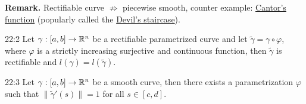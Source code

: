 \documentclass[../Analysis-3.tex]{subfiles}
\begin{document}
\textbf{Remark.} Rectifiable curve $\not\Rightarrow$ piecewise smooth, counter example: \href{https://en.wikipedia.org/wiki/Cantor_function}{Cantor's function} (popularly called the \href{https://mathweb.ucsd.edu/~bseward/140b_spring20/Devils-Staircase.pdf}{Devil's staircase}).

\begin{Thm}{}{22:2}
  Let $\gamma : [a,b] \to \mathbb{R}^n$ be a rectifiable parametrized curve and let $\tilde{\gamma} = \gamma \circ \varphi$, where $\varphi$ is a strictly increasing surjective and continuous function, then $\tilde{\gamma}$ is rectifiable and $l(\gamma) = l(\tilde{\gamma})$.
\end{Thm}

\begin{Thm}{}{22:3}
  Let $\gamma : [a,b] \to \mathbb{R}^n$ be a smooth curve, then there exists a parametrization $\varphi$ such that $\| \tilde{\gamma}'(s) \| = 1$ for all $s \in [c,d]$.
\end{Thm}
\end{document}
